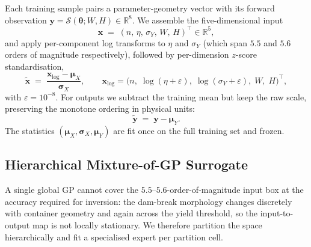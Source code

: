Each training sample pairs a parameter-geometry vector with its
forward observation
$\mathbf{y} = \mathcal{S}(\boldsymbol{\theta}; W, H) \in
\mathbb{R}^{8}$. We assemble the five-dimensional input
\begin{equation}
    \mathbf{x} \;=\; (n,\,\eta,\,\sigma_Y,\,W,\,H)^{\!\top}
    \in \mathbb{R}^{5},
\end{equation}
and apply per-component log transforms to $\eta$ and $\sigma_Y$
(which span $5.5$ and $5.6$ orders of magnitude respectively),
followed by per-dimension $z$-score standardisation,
\begin{equation}
\label{eq:xscale}
    \tilde{\mathbf{x}}
    \;=\; \frac{\mathbf{x}_{\log} - \boldsymbol{\mu}_X}{\boldsymbol{\sigma}_X},
    \qquad
    \mathbf{x}_{\log}
    = \bigl(n,\;\log(\eta + \varepsilon),\;
    \log(\sigma_Y + \varepsilon),\;W,\;H\bigr)^{\!\top},
\end{equation}
with $\varepsilon = 10^{-8}$. For outputs we subtract the training
mean but keep the raw scale, preserving the monotone ordering in
physical units:
\begin{equation}
\label{eq:yscale}
    \tilde{\mathbf{y}} \;=\; \mathbf{y} - \boldsymbol{\mu}_Y.
\end{equation}
The statistics
$(\boldsymbol{\mu}_X, \boldsymbol{\sigma}_X, \boldsymbol{\mu}_Y)$ are
fit once on the full training set and frozen.


\subsection{Hierarchical Mixture-of-GP Surrogate}
\label{sec:surrogate}

A single global GP cannot cover the $5.5$--$5.6$-order-of-magnitude
input box at the accuracy required for inversion: the dam-break
morphology changes discretely with container geometry and again
across the yield threshold, so the input-to-output map is not locally
stationary. We therefore partition the space hierarchically and fit a
specialised expert per partition cell.

